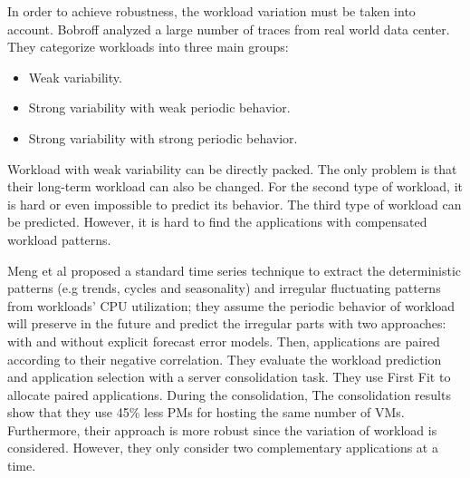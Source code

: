 In order to achieve robustness, the workload variation must be taken into account. Bobroff \cite{Bobroff:2007ec} analyzed a large number of traces from real world data center. They categorize workloads into three main groups: 

\begin{itemize}
	\item Weak variability.
	\item Strong variability with weak periodic behavior.
	\item Strong variability with strong periodic behavior.
\end{itemize}
Workload with weak variability can be directly packed. The only problem is that their long-term workload can also be changed. 
For the second type of workload, it is hard or even impossible to predict its behavior. The third type of workload can be predicted. However, it is hard to find the applications with compensated workload patterns. 

Meng et al \cite{Meng:2010gh} proposed a standard time series technique to extract the deterministic patterns (e.g trends, cycles and seasonality) and irregular fluctuating patterns from workloads' CPU utilization; they assume the periodic behavior of workload will preserve in the future and predict the irregular parts with two approaches: with and without explicit forecast error models. Then, applications are paired according to their negative correlation. They evaluate the workload prediction and application selection with a server consolidation task. They use First Fit to allocate paired applications. During the consolidation, The consolidation results show that they use 45\% less PMs for hosting the same number of VMs. Furthermore, their approach is more robust since the variation of workload is considered. However, they only consider two complementary applications at a time. 
% 




